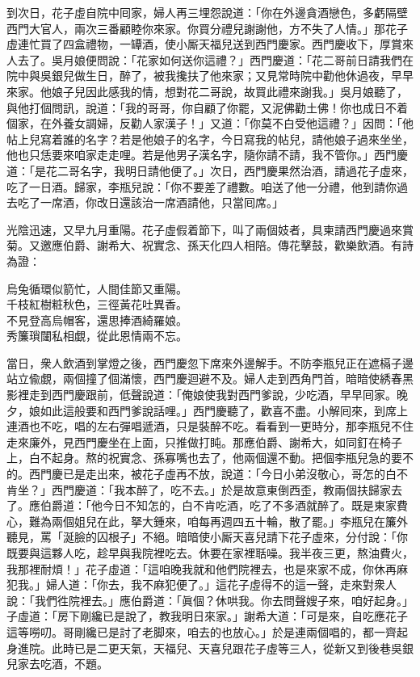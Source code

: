 到次日，花子虛自院中囘家，婦人再三埋怨說道：「你在外邊貪酒戀色，多虧隔壁西門大官人，兩次三番顧睦你來家。你買分禮兒謝謝他，方不失了人情。」那花子虛連忙買了四盒禮物，一罈酒，使小厮天福兒送到西門慶家。西門慶收下，厚賞來人去了。吳月娘便問說：「花家如何送你這禮？」西門慶道：「花二哥前日請我們在院中與吳銀兒做生日，醉了，被我攙扶了他來家；又見常時院中勸他休過夜，早早來家。他娘子兒因此感我的情，想對花二哥說，故買此禮來謝我。」{}吳月娘聽了，與他打個問訊，說道：「我的哥哥，你自顧了你罷，又泥佛勸土佛！你也成日不着個家，在外養女調婦，反勸人家漢子！」又道：「你莫不白受他這禮？」因問：「他帖上兒寫着誰的名字？若是他娘子的名字，今日寫我的帖兒，請他娘子過來坐坐，他也只恁要來咱家走走哩。{}若是他男子漢名字，隨你請不請，我不管你。」西門慶道：「是花二哥名字，我明日請他便了。」次日，西門慶果然治酒，請過花子虛來，吃了一日酒。歸家，李瓶兒說：「你不要差了禮數。咱送了他一分禮，他到請你過去吃了一席酒，你改日還該治一席酒請他，只當囘席。」

光陰迅速，又早九月重陽。花子虛假着節下，叫了兩個妓者，具柬請西門慶過來賞菊。又邀應伯爵、謝希大、祝實念、孫天化四人相陪。傳花擊鼓，歡樂飲酒。有詩為證：

\begin{myquote}
烏兔循環似箭忙，人間佳節又重陽。\\千枝紅樹粧秋色，三徑黃花吐異香。\\不見登高烏帽客，還思捧酒綺羅娘。\\秀簾瑣闥私相覷，從此恩情兩不忘。
\end{myquote}

當日，衆人飲酒到掌燈之後，西門慶忽下席來外邊解手。不防李瓶兒正在遮槅子邊站立偸覷，兩個撞了個滿懷，{}西門慶迴避不及。婦人走到西角門首，暗暗使綉春黑影裡走到西門慶跟前，低聲說道：「俺娘使我對西門爹說，少吃酒，早早囘家。晚夕，娘如此這般要和西門爹說話哩。」西門慶聽了，歡喜不盡。小解囘來，到席上連酒也不吃，唱的左右彈唱遞酒，只是裝醉不吃。看看到一更時分，那李瓶兒不住走來廉外，見西門慶坐在上面，只推做打盹。那應伯爵、謝希大，如同釘在椅子上，白不起身。熬的祝實念、孫寡嘴也去了，他兩個還不動。把個李瓶兒急的要不的。西門慶已是走出來，被花子虛再不放，說道：「今日小弟沒敬心，哥怎的白不肯坐？」西門慶道：「我本醉了，吃不去。」於是故意東倒西歪，教兩個扶歸家去了。應伯爵道：「他今日不知怎的，白不肯吃酒，吃了不多酒就醉了。既是東家費心，難為兩個姐兒在此，拏大鍾來，咱每再週四五十輪，散了罷。」李瓶兒在簾外聽見，罵「涎臉的囚根子」不絕。暗暗使小厮天喜兒請下花子虛來，分付說：「你既要與這夥人吃，趁早與我院裡吃去。休要在家裡聒噪。我半夜三更，熬油費火，我那裡耐煩！」花子虛道：「這咱晚我就和他們院裡去，也是來家不成，你休再麻犯我。」婦人道：「你去，我不麻犯便了。」這花子虛得不的這一聲，走來對衆人說：「我們徃院裡去。」應伯爵道：「眞個？休哄我。你去問聲嫂子來，咱好起身。」子虛道：「房下剛纔已是說了，教我明日來家。」謝希大道：「可是來，自吃應花子這等嘮叨。哥剛纔已是討了老脚來，咱去的也放心。」於是連兩個唱的，都一齊起身進院。此時已是二更天氣，天福兒、天喜兒跟花子虛等三人，從新又到後巷吳銀兒家去吃酒，不題。

